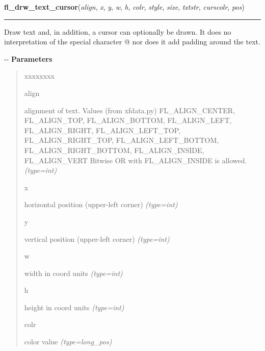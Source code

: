 \hspace{.8\funcindent}\begin{boxedminipage}{\funcwidth}

    \raggedright \textbf{fl\_drw\_text\_cursor}(\textit{align}, \textit{x}, \textit{y}, \textit{w}, \textit{h}, \textit{colr}, \textit{style}, \textit{size}, \textit{txtstr}, \textit{curscolr}, \textit{pos})

    \vspace{-1.5ex}

    \rule{\textwidth}{0.5\fboxrule}
\setlength{\parskip}{2ex}

Draw text and, in addition, a cursor can optionally be drawn. It does
no interpretation of the special character @ nor does it add padding
around the text.

-{}-
\setlength{\parskip}{1ex}
      \textbf{Parameters}
      \vspace{-1ex}

      \begin{quote}
        \begin{Ventry}{xxxxxxxx}

          \item[align]


alignment of text. Values (from xfdata.py) FL\_ALIGN\_CENTER,
FL\_ALIGN\_TOP, FL\_ALIGN\_BOTTOM, FL\_ALIGN\_LEFT, FL\_ALIGN\_RIGHT,
FL\_ALIGN\_LEFT\_TOP, FL\_ALIGN\_RIGHT\_TOP, FL\_ALIGN\_LEFT\_BOTTOM,
FL\_ALIGN\_RIGHT\_BOTTOM, FL\_ALIGN\_INSIDE, FL\_ALIGN\_VERT
Bitwise OR with FL\_ALIGN\_INSIDE is allowed.
            {\it (type=int)}

          \item[x]


horizontal position (upper-left corner)
            {\it (type=int)}

          \item[y]


vertical position (upper-left corner)
            {\it (type=int)}

          \item[w]


width in coord units
            {\it (type=int)}

          \item[h]


height in coord units
            {\it (type=int)}

          \item[colr]


color value
            {\it (type=long\_pos)}


\end{Ventry}
\end{quote}
\end{boxedminipage}
